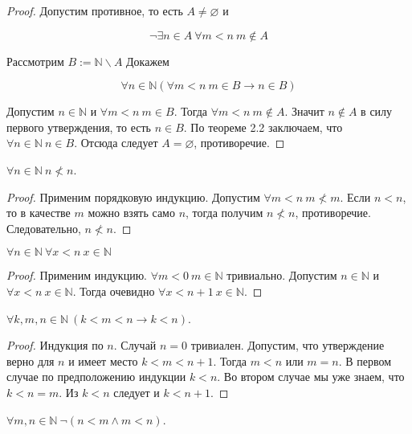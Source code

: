 {\begin{proof} Допустим противное, то есть $A \neq \varnothing$ и

	$$\neg \exists n \in A \ \forall m<n \  m \notin A$$

	Рассмотрим $B:=\mathbb{N} \backslash A$ Докажем

	$$\forall n \in \mathbb{N}(\forall m<n \  m \in B \rightarrow n \in B)$$

	Допустим $n \in \mathbb{N}$ и $\forall m<n \  m \in B$. Тогда $\forall m<n \ m \notin A$. Значит $n \notin A$ в
	силу первого утверждения, то есть $n \in B$. По теореме 2.2 заключаем, что $\forall n \in \mathbb{N} \ n \in
	B$. Отсюда следует $A = \varnothing$, противоречие.
\end{proof}

\begin{corollary}
	$\forall n \in \mathbb{N} \ n \not<n$.
\end{corollary}

\begin{proof} 
	Применим порядковую индукцию. Допустим $\forall m < n \ m \not< m$. Если $ n < n$, то в качестве $m$ можно
	взять само $n$, тогда получим
	$n \not< n$, противоречие. Следовательно, $n \not< n$. 
\end{proof}

\begin{corollary} 
	$\forall n \in \mathbb{N} \ \forall x<n \ x \in \mathbb{N}$ 
\end{corollary}

\begin{proof} 
	Применим индукцию. $\forall m < 0 \ m \in \mathbb{N}$ тривиально.
	Допустим $n \in \mathbb{N}$ и $\forall x<n \ x \in \mathbb{N}$. Тогда очевидно $\forall x<n+1 \ x \in \mathbb{N}$. 
\end{proof}

\begin{corollary} 
	$\forall k, m, n \in \mathbb{N} \ (k<m<n \rightarrow k<n)$.
\end{corollary}

\begin{proof} 
	Индукция по $n$. Случай $n = 0$ тривиален. Допустим, что утверждение верно для $n$ и имеет место $k<m<n + 1$.
	Тогда $m < n$ или $m = n$. В первом случае по предположению индукции $k < n$. Во втором случае мы уже знаем,
	что $k < n = m$. Из $k < n$ следует и
	$k < n + 1$. 
\end{proof}

\begin{corollary} 
	$\forall m, n \in \mathbb{N} \ \neg(n<m \wedge m<n)$.
\end{corollary}

}
